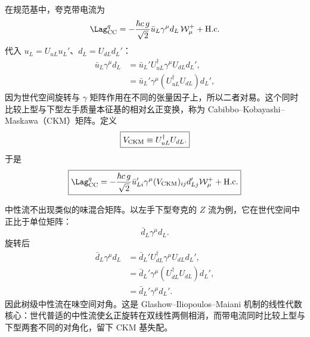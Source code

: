 \begin{definition}
在规范基中，夸克带电流为
\begin{equation*}
 \Lag_{\rm CC}^{q}
 =-\frac{\hbar c\,g}{\sqrt2}
 \bar u_L\gamma^\mu d_L\,\mathcal W_\mu^+
 +\mathrm{H.c.}
\end{equation*}
代入 $u_L=U_{uL}u_L'$、$d_L=U_{dL}d_L'$：
\begin{align*}
 \bar u_L\gamma^\mu d_L
 &=\bar u_L'U_{uL}^\dagger\gamma^\mu U_{dL}d_L',\\
 &=\bar u_L'\gamma^\mu
 \left(U_{uL}^\dagger U_{dL}\right)d_L',
\end{align*}
因为世代空间旋转与 $\gamma$ 矩阵作用在不同的张量因子上，所以二者对易。这个同时比较上型与下型左手质量本征基的相对幺正变换，称为 Cabibbo--Kobayashi--Maskawa（CKM）矩阵。定义
\begin{equation}
 \boxed{V_{\rm CKM}\equiv U_{uL}^\dagger U_{dL}.}
 \label{eq:ckm-definition-dp11}
\end{equation}
于是
\begin{equation}
 \boxed{
 \Lag_{\rm CC}^{q}
 =-\frac{\hbar c\,g}{\sqrt2}
 \bar u_{Li}'\gamma^\mu(V_{\rm CKM})_{ij}d_{Lj}'
 \mathcal W_\mu^+
 +\mathrm{H.c.}}
 \label{eq:quark-cc-ckm-dp11}
\end{equation}
\end{definition}



\begin{proposition}[世代普适中性流的味对角性]
中性流不出现类似的味混合矩阵。以左手下型夸克的 $Z$ 流为例，它在世代空间中正比于单位矩阵：
\begin{equation*}
 \bar d_L\gamma^\mu d_L.
\end{equation*}
旋转后
\begin{align*}
 \bar d_L\gamma^\mu d_L
 &=\bar d_L'U_{dL}^\dagger\gamma^\mu U_{dL}d_L',\\
 &=\bar d_L'\gamma^\mu
 (U_{dL}^\dagger U_{dL})d_L',\\
 &=\bar d_L'\gamma^\mu d_L'.
\end{align*}
因此树级中性流在味空间对角。这是 Glashow--Iliopoulos--Maiani 机制的线性代数核心：世代普适的中性流使幺正旋转在双线性两侧相消，而带电流同时比较上型与下型两套不同的对角化，留下 CKM 基失配。
\end{proposition}

